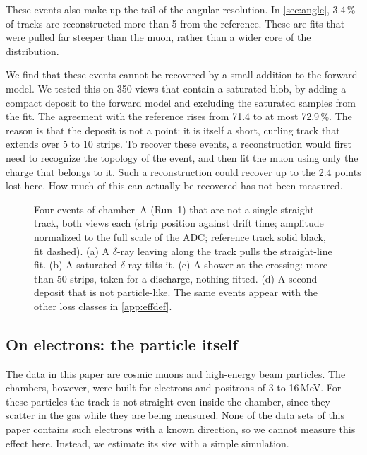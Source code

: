 These events also make up the tail of the angular resolution. In \cref{sec:angle}, 3.4\,\% of tracks are
reconstructed more than 5\textdegree{} from the reference. These are fits that were pulled far steeper than the muon,
rather than a wider core of the distribution.

We find that these events cannot be recovered by a small addition to the forward model. We tested this on 350 views that
contain a saturated blob, by adding a compact deposit to the forward model and excluding the saturated samples from
the fit. The agreement with the reference rises from 71.4 to at most 72.9\,\%. The reason is that the deposit is not
a point: it is itself a short, curling track that extends over 5 to 10 strips. To recover these events, a
reconstruction would first need to recognize the topology of the event, and then fit the muon using only the charge
that belongs to it. Such a reconstruction could recover up to the 2.4 points lost here. How much of this can actually
be recovered has not been measured.

\begin{figure}[tbp]
  \centering
  \caption{Four events of chamber~A (Run~1) that are not a single straight track, both views each (strip position
  against drift time; amplitude normalized to the full scale of the ADC; reference track solid black, fit dashed).
  (a) A $\delta$-ray leaving along the track pulls the straight-line fit. (b) A saturated $\delta$-ray tilts it. (c) A
  shower at the crossing: more than 50 strips, taken for a discharge, nothing fitted. (d) A second deposit that is
  not particle-like. The same events appear with the other loss classes in \cref{app:effdef}.}
  \label{fig:notstraight}
\end{figure}

\subsection{On electrons: the particle itself}\label{sec:gasscatter}
The data in this paper are cosmic muons and high-energy beam particles. The chambers, however, were built for
electrons and positrons of 3 to 16\,MeV. For these particles the track is not straight even inside the chamber, since
they scatter in the gas while they are being measured. None of the data sets of this paper contains such electrons
with a known direction, so we cannot measure this effect here. Instead, we estimate its size with a simple simulation.

